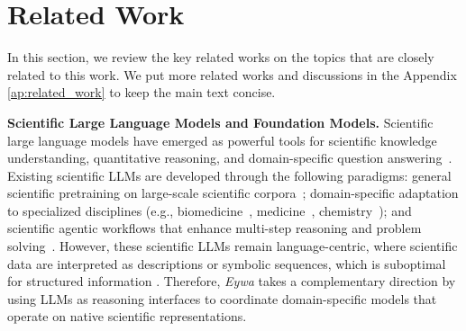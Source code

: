 \documentclass{llmxive}
\begin{document}
{\section{Related Work}

In this section, we review the key related works on the topics that are closely related to this work. We put more related works and discussions in the Appendix \ref{ap:related_work} to keep the main text concise.

\textbf{Scientific Large Language Models and Foundation Models.} 
Scientific large language models have emerged as powerful tools for scientific knowledge understanding, quantitative reasoning, and domain-specific question answering~\citep{hu2025survey, zhang2024comprehensive}. 
Existing scientific LLMs are developed through the following paradigms: general scientific pretraining on large-scale scientific corpora~\citep{taylor2022galactica,lewkowycz2022solving}; domain-specific adaptation to specialized disciplines (e.g., biomedicine~\citep{luo2022biogpt}, medicine~\citep{singhal2023large}, chemistry~\citep{zhang2024chemllm,yu2024llasmol}); and scientific agentic workflows that enhance multi-step reasoning and problem solving~\citep{zhang2024sciglm, boiko2023autonomous, ghafarollahi2025sciagents}. 
However, these scientific LLMs remain language-centric, where scientific data are interpreted as descriptions or symbolic sequences, which is suboptimal for structured information \cite{jin2023time, sui2024table, sadeghi2024can}.
Therefore, \textit{Eywa} takes a complementary direction by using LLMs as reasoning interfaces to coordinate domain-specific models that operate on native scientific representations.


}
\end{document}
